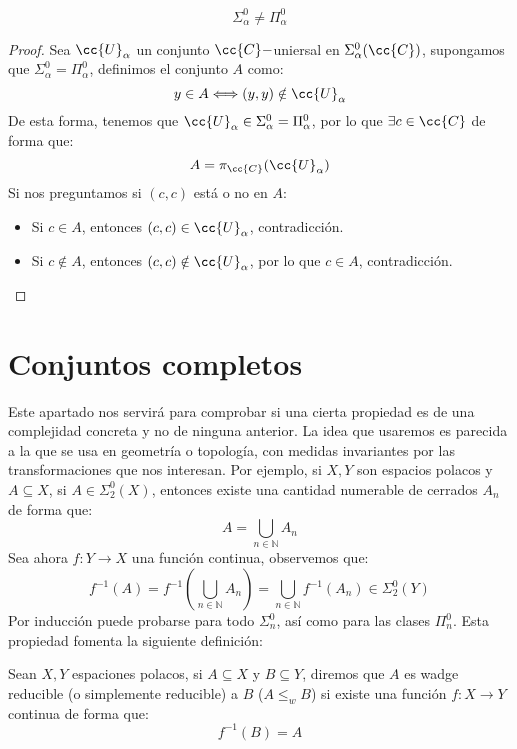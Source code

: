 \begin{lema}
    \begin{equation*}
        \Sigma^0_\alpha \neq \Pi^0_\alpha
    \end{equation*}
    \begin{proof}
        Sea $\cc{U}_\alpha$ un conjunto $\cc{C}-$uniersal en $\Sigma^0_\alpha(\cc{C})$, supongamos que $\Sigma^0_\alpha = \Pi^0_\alpha$, definimos el conjunto $A$ como:
        \begin{equation*}
            y\in A \Longleftrightarrow (y,y) \notin \cc{U}_\alpha
        \end{equation*}
        De esta forma, tenemos que $\cc{U}_\alpha\in \Sigma^0_\alpha = \Pi^0_\alpha$, por lo que $\exists c\in \cc{C}$ de forma que:
        \begin{equation*}
            A = \pi_{\cc{C}}(\cc{U}_\alpha)
        \end{equation*}
        Si nos preguntamos si $(c,c)$ está o no en $A$:
        \begin{itemize}
            \item Si $c\in A$, entonces $(c,c)\in \cc{U}_\alpha$, contradicción.
            \item Si $c\notin A$, entonces $(c,c)\notin \cc{U}_{\alpha}$, por lo que $c\in A$, contradicción.
        \end{itemize}
    \end{proof}
\end{lema}

\section{Conjuntos completos}
Este apartado nos servirá para comprobar si una cierta propiedad es de una complejidad concreta y no de ninguna anterior. La idea que usaremos es parecida a la que se usa en geometría o topología, con medidas invariantes por las transformaciones que nos interesan. Por ejemplo, si $X,Y$ son espacios polacos y $A\subseteq X$, si $A\in \Sigma^0_2(X)$, entonces existe una cantidad numerable de cerrados $A_n$ de forma que:
\begin{equation*}
    A = \bigcup_{n\in \mathbb{N}} A_n
\end{equation*}
Sea ahora $f:Y\to X$ una función continua, observemos que:
\begin{equation*}
    f^{-1}(A) = f^{-1}\left(\bigcup_{n\in \mathbb{N}}A_n\right) = \bigcup_{n\in \mathbb{N}}f^{-1}(A_n) \in \Sigma^0_2(Y)
\end{equation*}
Por inducción puede probarse para todo $\Sigma^0_n$, así como para las clases $\Pi^0_n$.
Esta propiedad fomenta la siguiente definición:
\begin{definicion}
    Sean $X,Y$ espaciones polacos, si $A\subseteq X$ y $B\subseteq Y$, diremos que $A$ es wadge reducible (o simplemente reducible) a $B$ ($A\leq_{w}B$) si existe una función $f:X\to Y$ continua de forma que:
    \begin{equation*}
        f^{-1}(B) = A
    \end{equation*}
\end{definicion}

